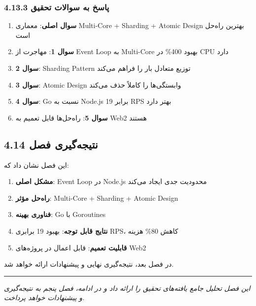\documentclass[
]{article}
\providecommand{\tightlist}{%
  \setlength{\itemsep}{0pt}\setlength{\parskip}{0pt}}
\begin{document}
\subsubsection{4.13.3 پاسخ به سوالات
تحقیق}\label{ux67eux627ux633ux62e-ux628ux647-ux633ux648ux627ux644ux627ux62a-ux62aux62dux642ux6ccux642}

\begin{enumerate}
\def\labelenumi{\arabic{enumi}.}
\tightlist
\item
  \textbf{سوال اصلی}: معماری Multi-Core + Sharding + Atomic Design
  بهترین راه‌حل است
\item
  \textbf{سوال 1}: مهاجرت از Event Loop به Multi-Core بهبود 400\% در CPU
  دارد
\item
  \textbf{سوال 2}: Sharding Pattern توزیع متعادل بار را فراهم می‌کند
\item
  \textbf{سوال 3}: Atomic Design وابستگی‌ها را کاملاً حذف می‌کند
\item
  \textbf{سوال 4}: Go نسبت به Node.js 19 برابر RPS بهتر دارد
\item
  \textbf{سوال 5}: راه‌حل‌ها قابل تعمیم به Web2 هستند
\end{enumerate}

\subsection{4.14 نتیجه‌گیری
فصل}\label{ux646ux62aux6ccux62cux647ux6afux6ccux631ux6cc-ux641ux635ux644}

این فصل نشان داد که:

\begin{enumerate}
\def\labelenumi{\arabic{enumi}.}
\tightlist
\item
  \textbf{مشکل اصلی}: Event Loop در Node.js محدودیت جدی ایجاد می‌کند
\item
  \textbf{راه‌حل مؤثر}: Multi-Core + Sharding + Atomic Design
\item
  \textbf{فناوری بهینه}: Go با Goroutines
\item
  \textbf{نتایج قابل توجه}: بهبود 19 برابری RPS، کاهش 80\% هزینه
\item
  \textbf{قابلیت تعمیم}: قابل اعمال در پروژه‌های Web2
\end{enumerate}

در فصل بعد، نتیجه‌گیری نهایی و پیشنهادات ارائه خواهد شد.

\begin{center}\rule{0.5\linewidth}{0.5pt}\end{center}

\emph{این فصل تحلیل جامع یافته‌های تحقیق را ارائه داد و در ادامه، فصل
پنجم به نتیجه‌گیری و پیشنهادات خواهد پرداخت.}
\end{document}
